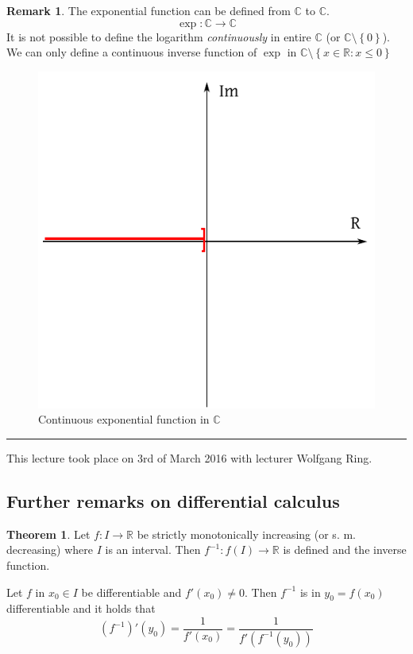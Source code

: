 \documentclass[a4paper,landscape,twocolumn]{article}
\theoremstyle{definition}
\newtheorem{theorem}{Theorem}
\newtheorem{rem}{Remark}
\newcommand\set[1]{\left\{#1\right\}}
\newcommand\meta[3]{\hrule{} This #1 took place on #2 with lecturer #3.\par}
\begin{document}
\begin{rem}
  The exponential function can be defined from $\mathbb C$ to $\mathbb C$.
  \[ \exp: \mathbb C \to \mathbb C \]
  It is not possible to define the logarithm \emph{continuously} in entire $\mathbb C$
  (or $\mathbb C \setminus \set{0}$). We can only define a continuous inverse function
  of $\exp$ in $\mathbb C \setminus \set{x \in \mathbb R: x \leq 0}$
\end{rem}

\begin{figure}[!h]
  \begin{center}
    \includegraphics{img/continuous-exp-in-C.pdf}
    \caption{Continuous exponential function in $\mathbb C$}
  \end{center}
\end{figure}

\meta{lecture}{3rd of March 2016}{Wolfgang Ring}

\subsection{Further remarks on differential calculus}

\begin{theorem}
  Let $f: I \to \mathbb R$ be strictly monotonically increasing (or s. m. decreasing)
  where $I$ is an interval. Then $f^{-1}: f(I) \to \mathbb R$ is defined and the inverse function.

  Let $f$ in $x_0 \in I$ be differentiable and $f'(x_0) \neq 0$. Then $f^{-1}$ is in $y_0 = f(x_0)$
  differentiable and it holds that
  \[ (f^{-1})'(y_0) = \frac{1}{f'(x_0)} = \frac{1}{f'(f^{-1}(y_0))} \]
\end{theorem}
\end{document}
